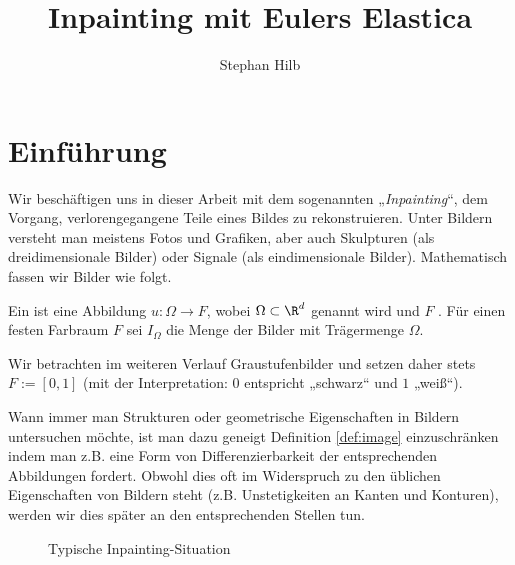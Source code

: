 \documentclass{mythesis}
\title{Inpainting mit Eulers Elastica}
\author{Stephan Hilb}
\begin{document}


\chapter{Einführung} \label{chap:intro}

%
%


Wir beschäftigen uns in dieser Arbeit mit dem sogenannten „\emph{Inpainting}“, dem Vorgang, verlorengegangene Teile eines Bildes zu rekonstruieren.
Unter Bildern versteht man meistens Fotos und Grafiken, aber auch Skulpturen (als dreidimensionale Bilder) oder Signale (als eindimensionale Bilder).
Mathematisch fassen wir Bilder wie folgt.

\begin{definition} \label{def:image}
    Ein  ist eine Abbildung $u: \Omega \to F$, wobei $\Omega \subset \R^d$
     genannt wird und $F$ .
    Für einen festen Farbraum $F$ sei $I_\Omega$ die Menge der Bilder mit Trägermenge $\Omega$.
    \begin{note}
	Wir betrachten im weiteren Verlauf Graustufenbilder und setzen daher stets $F := [0,1]$ (mit der
	Interpretation: $0$ entspricht „schwarz“ und $1$ „weiß“).
    \end{note}
\end{definition}

Wann immer man Strukturen oder geometrische Eigenschaften in Bildern untersuchen möchte, ist man dazu geneigt Definition \ref{def:image} einzuschränken indem man z.B. eine Form von Differenzierbarkeit der entsprechenden Abbildungen fordert.
Obwohl dies oft im Widerspruch zu den üblichen Eigenschaften von Bildern steht (z.B. Unstetigkeiten an Kanten und Konturen), werden wir dies später an den entsprechenden Stellen tun.

\begin{figure}[ht]
    \centering
    \caption{Typische Inpainting-Situation}
    \label{fig:inpainting_setting}
\end{figure}
\end{document}
